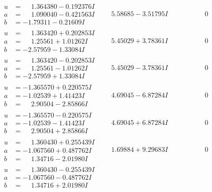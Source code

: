 \documentclass[1p]{elsarticle_modified}
\theoremstyle{definition}
\begin{document}
$$\begin{array}{c|c|c}
\begin{aligned}
u &= \phantom{-}1.364380 - 0.192376 I \\
a &= \phantom{-}1.090040 - 0.421563 I \\
b &= -1.79311 - 0.21609 I\end{aligned}
 & \phantom{-}5.58685 - 3.51795 I & \phantom{-0.000000 } 0 \\ \hline\begin{aligned}
u &= \phantom{-}1.363420 + 0.202853 I \\
a &= \phantom{-}1.25561 + 1.01262 I \\
b &= -2.57959 - 1.33084 I\end{aligned}
 & \phantom{-}5.45029 + 3.78361 I & \phantom{-0.000000 } 0 \\ \hline\begin{aligned}
u &= \phantom{-}1.363420 - 0.202853 I \\
a &= \phantom{-}1.25561 - 1.01262 I \\
b &= -2.57959 + 1.33084 I\end{aligned}
 & \phantom{-}5.45029 - 3.78361 I & \phantom{-0.000000 } 0 \\ \hline\begin{aligned}
u &= -1.365570 + 0.220575 I \\
a &= -1.02539 + 1.41423 I \\
b &= \phantom{-}2.90504 - 2.85866 I\end{aligned}
 & \phantom{-}4.69045 - 6.87284 I & \phantom{-0.000000 } 0 \\ \hline\begin{aligned}
u &= -1.365570 - 0.220575 I \\
a &= -1.02539 - 1.41423 I \\
b &= \phantom{-}2.90504 + 2.85866 I\end{aligned}
 & \phantom{-}4.69045 + 6.87284 I & \phantom{-0.000000 } 0 \\ \hline\begin{aligned}
u &= \phantom{-}1.360430 + 0.255439 I \\
a &= -1.067560 + 0.487762 I \\
b &= \phantom{-}1.34716 - 2.01980 I\end{aligned}
 & \phantom{-}1.69884 + 9.29683 I & \phantom{-0.000000 } 0 \\ \hline\begin{aligned}
u &= \phantom{-}1.360430 - 0.255439 I \\
a &= -1.067560 - 0.487762 I \\
b &= \phantom{-}1.34716 + 2.01980 I\end{aligned}

\end{array}$$
\end{document}
